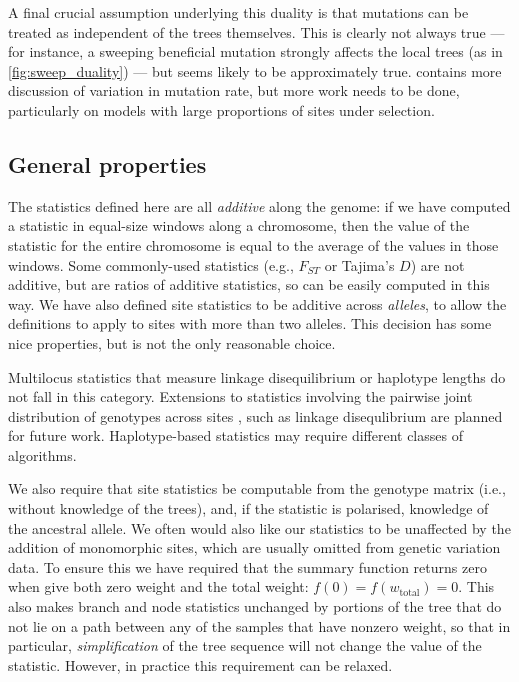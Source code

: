 \documentclass{article}
\newcommand{\tiw}{w_\text{total}} %
\begin{document}
A final crucial assumption underlying this duality is that mutations can be treated
as independent of the trees themselves.
This is clearly not always true --- for instance,
a sweeping beneficial mutation strongly affects the local trees (as in \autoref{fig:sweep_duality}) ---
but seems likely to be approximately true.
\citet{ralph2019empirical} contains more discussion of variation in mutation rate,
but more work needs to be done, particularly on models with large proportions of sites under selection.


\subsection*{General properties}

The statistics defined here are all \emph{additive} along the genome:
if we have computed a statistic in equal-size windows along a chromosome,
then the value of the statistic for the entire chromosome is equal to
the average of the values in those windows.
Some commonly-used statistics (e.g., $F_{ST}$ or Tajima's $D$)
are not additive, but are ratios of additive statistics, so can be easily computed in this way.
We have also defined site statistics to be additive across \emph{alleles},
to allow the definitions to apply to sites with more than two alleles.
This decision has some nice properties, but is not the only reasonable choice.

Multilocus statistics that measure linkage disequilibrium or haplotype lengths
do not fall in this category.
Extensions to statistics involving the pairwise joint distribution of genotypes across sites
\citep[as used by][]{hudson2001twolocus},
such as linkage disequlibrium are planned for future work.
Haplotype-based statistics may require different classes of algorithms.

We also require that site statistics be computable from the genotype matrix
(i.e., without knowledge of the trees),
and, if the statistic is polarised, knowledge of the ancestral allele.
We often would also like our statistics to be unaffected by the addition of monomorphic sites,
which are usually omitted from genetic variation data.
To ensure this we have required that the summary function returns zero when give both zero weight
and the total weight: $f(0) = f(\tiw) = 0$.
This also makes branch and node statistics unchanged by portions of the tree that do not lie on a path
between any of the samples that have nonzero weight,
so that in particular,
\emph{simplification} of the tree sequence will not change the value of the statistic.
However, in practice this requirement can be relaxed.
\end{document}
